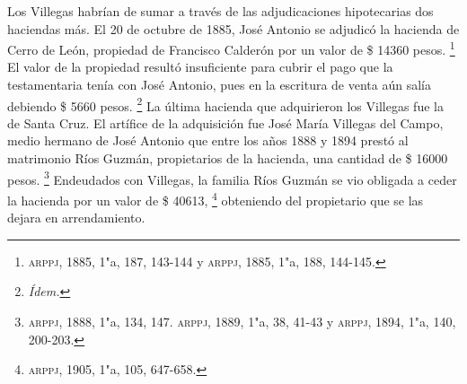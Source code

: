 \documentclass[14pt,twoside,final]{extbook} %
\let\oldfootnote\footnote
\renewcommand\footnote[1]{%
\oldfootnote{\hspace{1mm}#1}}
\begin{document}
Los Villegas habrían de sumar a través de las adjudicaciones hipotecarias dos haciendas más. El 20 de octubre de 1885, José Antonio se adjudicó la hacienda de Cerro de León, propiedad de Francisco Calderón por un valor de \$ 14360 pesos.\footnote{\textsc{arppj}, 1885, 1"a, 187, 143-144 y \textsc{arppj}, 1885, 1"a, 188, 144-145.} El valor de la propiedad resultó insuficiente para cubrir el pago que la testamentaria tenía con José Antonio, pues en la escritura de venta aún salía debiendo \$ 5660 pesos.\footnote{\em Ídem.} La última hacienda que adquirieron los Villegas fue la de Santa Cruz. El artífice de la adquisición fue José María Villegas del Campo, medio hermano de José Antonio que entre los años 1888 y 1894 prestó al matrimonio Ríos Guzmán, propietarios de la hacienda, una cantidad de \$ 16000 pesos.\footnote{\textsc{arppj}, 1888, 1"a, 134, 147. \textsc{arppj}, 1889, 1"a, 38, 41-43 y \textsc{arppj}, 1894, 1"a, 140, 200-203.} Endeudados con Villegas, la familia Ríos Guzmán se vio obligada a ceder la hacienda por un valor de \$ 40613,\footnote{\textsc{arppj}, 1905, 1"a, 105, 647-658.} obteniendo del propietario que se las dejara en arrendamiento.
\end{document}
